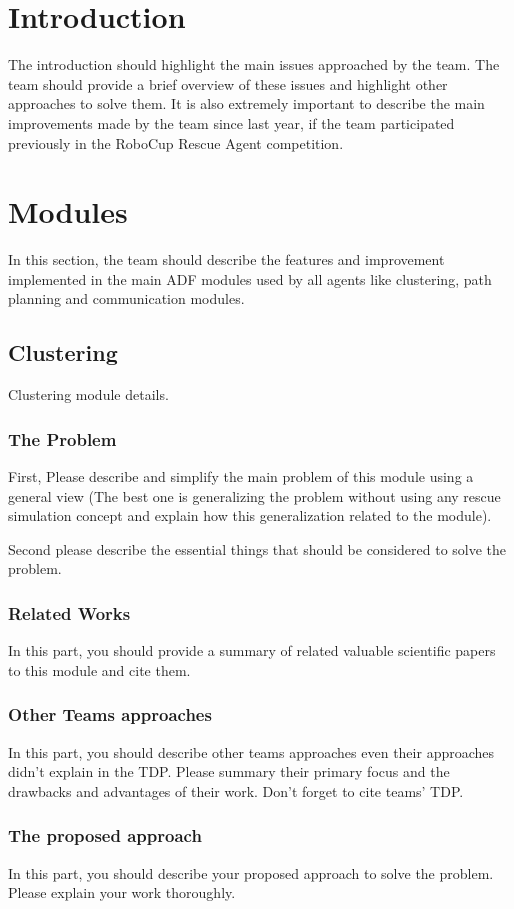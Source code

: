 \documentclass[runningheads,a4paper]{llncs}
\begin{document}
\section{Introduction}
The introduction should highlight the main issues approached by the team. The
team should provide a brief overview of these issues and highlight other
approaches to solve them. It is also extremely important to describe the main
improvements made by the team since last year, if the team participated
previously in the RoboCup Rescue Agent competition.
\section{Modules}
In this section, the team should describe the features and improvement
implemented in the main ADF modules used by all agents like clustering, path
planning and communication modules.
\subsection{Clustering}
Clustering module details.
\subsubsection{The Problem}
First, Please describe and simplify the main problem of this module using a general view (The best one is generalizing the problem without using any rescue simulation concept and explain how this generalization related to the module).

Second please describe the essential things that should be considered to solve the problem.
\subsubsection{Related Works}
In this part, you should provide a summary of related valuable scientific papers to this module and cite them.
\subsubsection{Other Teams approaches}
In this part, you should describe other teams approaches even their approaches didn't explain in the TDP. Please summary their primary focus and the drawbacks and advantages of their work. Don't forget to cite teams' TDP.
\subsubsection{The proposed approach}
In this part, you should describe your proposed approach to solve the problem. Please explain your work thoroughly.
\end{document}
